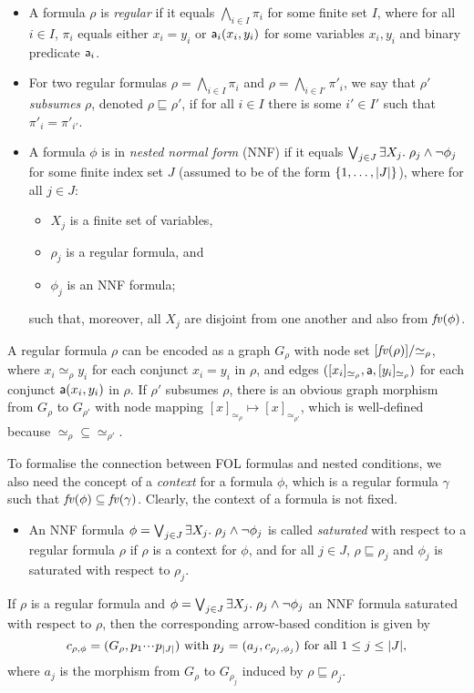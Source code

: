 %
\begin{itemize}
\item A formula $\rho$ is \emph{regular} if it equals $\bigwedge_{i\in I} \pi_i$ for some finite set $I$, where for all $i\in I$, $\pi_i$ equals either $x_i=y_i$ or $\mathsf{a}_i(x_i,y_i)$ for some variables $x_i,y_i$ and binary predicate $\mathsf{a}_i$.

\item For two regular formulas $\rho=\bigwedge_{i\in I} \pi_i$ and $\rho=\bigwedge_{i\in I'} \pi'_i$, we say that $\rho'$ \emph{subsumes} $\rho$, denoted $\rho\sqsubseteq \rho'$, if for all $i\in I$ there is some $i'\in I'$ such that $\pi'_i=\pi'_{i'}$.

\item A formula $\phi$ is in \emph{nested normal form} (NNF) if it equals $\bigvee_{j\in J} \exists X_j.\; \rho_j\wedge\neg \phi_j$ for some finite index set $J$ (assumed to be of the form $\{{1,\ldots,|J|}\}$), where for all $j\in J$:
\begin{itemize}
\item $X_j$ is a finite set of variables,
\item $\rho_j$ is a regular formula, and
\item $\phi_j$ is an NNF formula;
\end{itemize}
such that, moreover, all $X_j$ are disjoint from one another and also from $\mathit{fv}(\phi)$.
\end{itemize}
%
A regular formula $\rho$ can be encoded as a graph $G_\rho$ with node set $[\mathit{fv}(\rho)]/{\simeq_\rho}$, where $x_i\simeq_\rho y_i$ for each conjunct $x_i=y_i$ in $\rho$, and edges $([x_i]_{\simeq_\rho},\mathsf{a},[y_i]_{\simeq_\rho})$ for each conjunct $\mathsf{a}(x_i,y_i)$ in $\rho$. If $\rho'$ subsumes $\rho$, there is an obvious graph morphism from $G_\rho$ to $G_{\rho'}$ with node mapping $[x]_{\simeq_\rho}\mapsto [x]_{\simeq_{\rho'}}$, which is well-defined because ${\simeq_\rho}\subseteq {\simeq_{\rho'}}$.

To formalise the connection between FOL formulas and nested conditions, we also need the concept of a \emph{context} for a formula $\phi$, which is a regular formula $\gamma$ such that $\mathit{fv}(\phi)\subseteq \mathit{fv}(\gamma)$. Clearly, the context of a formula is not fixed.
%
\begin{itemize}
\item An NNF formula $\phi=\bigvee_{j\in J} \exists X_j.\; \rho_j\wedge\neg \phi_j$ is called \emph{saturated} with respect to a regular formula $\rho$ if $\rho$ is a context for $\phi$, and for all $j\in J$, $\rho\sqsubseteq \rho_j$ and $\phi_j$ is saturated with respect to $\rho_j$.
\end{itemize}
%
If $\rho$ is a regular formula and $\phi=\bigvee_{j\in J} \exists X_j.\; \rho_j\wedge\neg \phi_j$ an NNF formula saturated with respect to $\rho$, then the corresponding arrow-based condition is given by
\[ c_{\rho,\phi}=(G_\rho,p_1{\cdotp\mkern-2mu\cdotp\mkern-2mu\cdotp\mkern1mu} p_{|J|}) \text{ with } p_j=(a_j,c_{\rho_j,\phi_j}) \text{ for all $1\leq j\leq |J|$,}
\]
where $a_j$ is the morphism from $G_\rho$ to $G_{\rho_j}$ induced by $\rho\sqsubseteq \rho_j$.

